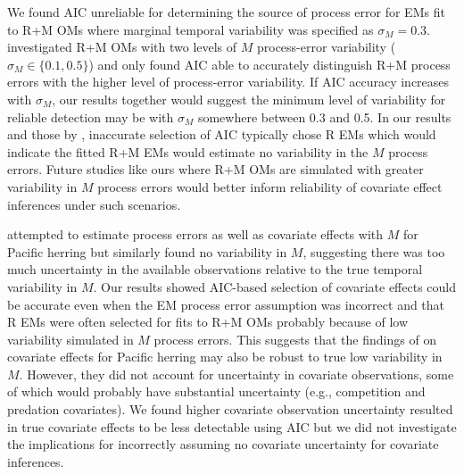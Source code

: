 \documentclass[
  12pt,
]{article}
\begin{document}
We found AIC unreliable for determining the source of process error for
EMs fit to R+M OMs where marginal temporal variability was specified as
\(\sigma_M = 0.3\). \citet{milleretal26} investigated R+M OMs with two
levels of \(M\) process-error variability (\(\sigma_M \in \{0.1,0.5\}\))
and only found AIC able to accurately distinguish R+M process errors
with the higher level of process-error variability. If AIC accuracy
increases with \(\sigma_M\), our results together would suggest the
minimum level of variability for reliable detection may be with
\(\sigma_M\) somewhere between 0.3 and 0.5. In our results and those by
\citet{milleretal26}, inaccurate selection of AIC typically chose R EMs
which would indicate the fitted R+M EMs would estimate no variability in
the \(M\) process errors. Future studies like ours where R+M OMs are
simulated with greater variability in \(M\) process errors would better
inform reliability of covariate effect inferences under such scenarios.

\citet{derisoetal08} attempted to estimate process errors as well as
covariate effects with \(M\) for Pacific herring but similarly found no
variability in \(M\), suggesting there was too much uncertainty in the
available observations relative to the true temporal variability in
\(M\). Our results showed AIC-based selection of covariate effects could
be accurate even when the EM process error assumption was incorrect and
that R EMs were often selected for fits to R+M OMs probably because of
low variability simulated in \(M\) process errors. This suggests that
the findings of \citet{derisoetal08} on covariate effects for Pacific
herring may also be robust to true low variability in \(M\). However,
they did not account for uncertainty in covariate observations, some of
which would probably have substantial uncertainty (e.g., competition and
predation covariates). We found higher covariate observation uncertainty
resulted in true covariate effects to be less detectable using AIC but
we did not investigate the implications for incorrectly assuming no
covariate uncertainty for covariate inferences.
\end{document}
